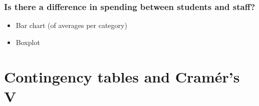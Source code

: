 \documentclass{beamer}
\begin{document}
\begin{frame}
  \frametitle{Is there a difference in spending between students and staff?}
  \begin{itemize}
    \item \alert<1>{Bar chart} (of averages per category)
    \item \alert<2>{Boxplot}
  \end{itemize}

  \begin{figure}
    \centering
  \end{figure}

\end{frame}

\section{Contingency tables and Cramér's V}
\sectionframelogo{}
\end{document}
